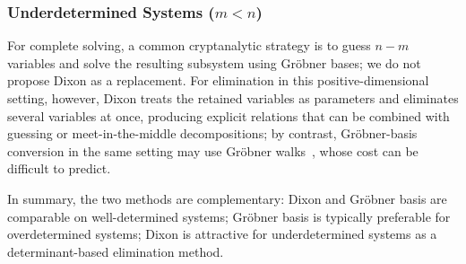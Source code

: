 \subsubsection{Underdetermined Systems ($m < n$)}

For complete solving, a common cryptanalytic strategy is to guess $n-m$ variables and solve the resulting subsystem using Gr\"obner bases; we do not propose Dixon as a replacement. For elimination in this positive-dimensional setting, however, Dixon treats the retained variables as parameters and eliminates several variables at once, producing explicit relations that can be combined with guessing or meet-in-the-middle decompositions; by contrast, Gr\"obner-basis conversion in the same setting
may use Gr\"obner walks~\cite{DBLP:journals/jsc/CollartKM97}, whose cost can be difficult to predict.

\smallskip\noindent
In summary, the two methods are complementary: Dixon and Gr\"obner basis are comparable on well-determined systems; Gr\"obner basis is typically preferable for overdetermined systems; Dixon is attractive for underdetermined systems as a determinant-based elimination method.
